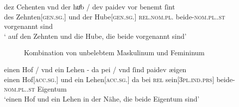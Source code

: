 \begin{exe}
\ex \label{ex:iclgr2}
\begin{xlist}
	\ex \label{ex:iclgr2_1}
		\gll %
			dez Cehenten vnd der huͦb / dev paidev {vor benemt} ſint \\
			des Zehnten[\textsc{gen.sg.\MascI}] und der
				Hube[\textsc{gen.sg.\FemI}] {} \textsc{rel.nom.pl.\NeutI}
				beide-\textsc{nom.pl.\NeutI.st} vorgenannt sind \\
			\trans ` auf den Zehnten und die Hube,
				die beide vorgenannt sind'
				\parencites(Nr.~3261, Regensburg, 1299)[424,38--39]{cao4}

	\begin{figure}
	\caption{Kombination von unbelebtem Maskulinum und Femininum}
	\label{fig:iclgr2_1}
	\end{figure}

	\ex \label{ex:iclgr2_2}
		\gll einen Hof / vnd ein Lehen - da pei / vnd ſind paidev æigen \\
			einen Hof[\textsc{acc.sg.\MascI}] {} und ein
				Lehen[\textsc{acc.sg.\NeutI}] {} da bei {} \textsc{rel}
				sein[\textsc{3pl\subM.ind.prs}] beide-\textsc{nom.pl.\NeutI.st}
				Eigentum \\
			\trans `einen Hof und ein Lehen in der Nähe, die beide Eigentum
				sind'
				\parencites(Nr.~1923, Steyr, 1294)[194,36--37]{cao3}


\end{xlist}
\end{exe}
